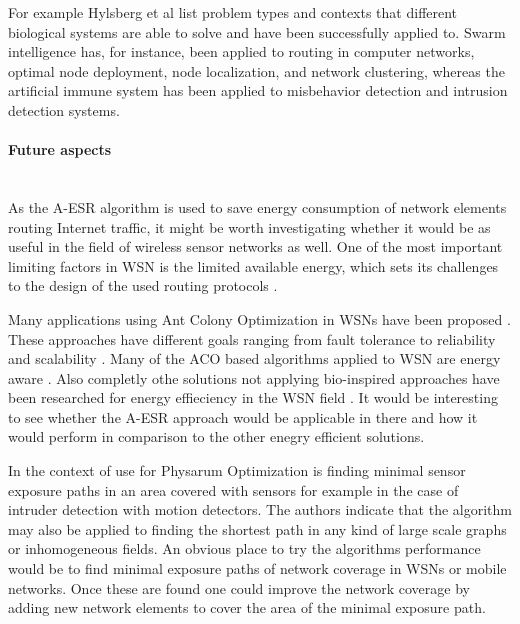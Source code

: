 \documentclass[cameraready]{IWORK2014}
\begin{document}
For example Hylsberg et al \cite{hylsberg2011bioinspired} list problem types and contexts that different biological systems are able to solve and have been successfully applied to. Swarm intelligence has, for instance, been applied to routing in computer networks, optimal node deployment, node localization, and network clustering, whereas the artificial immune system has been applied to misbehavior detection and intrusion detection systems.

\paragraph{Future aspects}~\\
As the A-ESR algorithm is used to save energy consumption of network elements routing Internet traffic, it might be worth investigating whether it would be as useful in the field of wireless sensor networks as well. One of the most important limiting factors in WSN is the limited available energy, which sets its challenges to the design of the used routing protocols \cite{hylsberg2011bioinspired}.

Many applications using Ant Colony Optimization in WSNs have been proposed \cite{bennis2013enhanced, zhang2004improvements, camilo2006energy, cai2006aco, sun2008asar, kiri2007self, ghasemaghaei2007ant}. These approaches have different goals ranging from fault tolerance \cite{zhang2004improvements} to reliability and scalability \cite{kiri2007self}. Many of the ACO based algorithms applied to WSN are energy aware \cite{saleem2011swarm}. Also completly othe solutions not applying bio-inspired approaches have been researched for energy effieciency in the WSN field \cite{wightman2008a3}. It would be interesting to see whether the A-ESR approach would be applicable in there and how it would perform in comparison to the other enegry efficient solutions.

In \cite{liu2012physarum} the context of use for Physarum Optimization is finding minimal sensor exposure paths in an area covered with sensors for example in the case of intruder detection with motion detectors. The authors indicate that the algorithm may also be applied to finding the shortest path in any kind of large scale graphs or inhomogeneous fields. An obvious place to try the algorithms performance would be to find minimal exposure paths of network coverage in WSNs or mobile networks. Once these are found one could improve the network coverage by adding new network elements to cover the area of the minimal exposure path.



\end{document}

